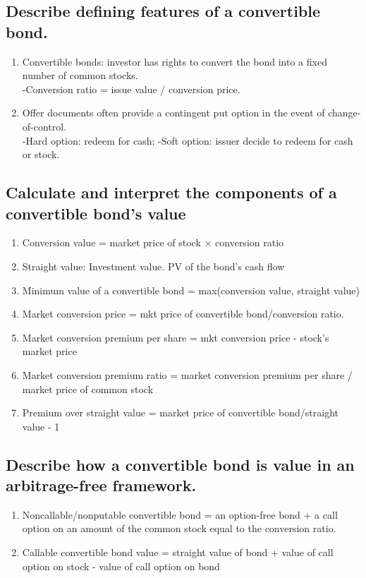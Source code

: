\documentclass{article}
\newcommand{\be}{\begin{enumerate}}
\newcommand{\ee}{\end{enumerate}}
\begin{document}
\subsection{Describe defining features of a convertible bond.}
\be
    \item Convertible bonds: investor has rights to convert the bond into a fixed number of common stocks.
        \\-Conversion ratio = issue value / conversion price.
    \item Offer documents often provide a contingent put option in the event of change-of-control.
        \\-Hard option: redeem for cash; -Soft option: issuer decide to redeem for cash or stock.
\ee
\subsection{Calculate and interpret the components of a convertible bond's value}
\be
    \item Conversion value = market price of stock $\times$ conversion ratio
    \item Straight value: Investment value. PV of the bond's cash flow
    \item Minimum value of a convertible bond = max(conversion value, straight value)
    \item Market conversion price = mkt price of convertible bond/conversion ratio.
    \item Market conversion premium per share = mkt conversion price - stock's market price
    \item Market conversion premium ratio = market conversion premium per share / market price of common stock
    \item Premium over straight value = market price of convertible bond/straight value - 1
\ee
\subsection{Describe how a convertible bond is value in an arbitrage-free framework.}
\be
    \item Noncallable/nonputable convertible bond = an option-free bond + a call option on an
    amount of the common stock equal to the conversion ratio.
    \item Callable convertible bond value = straight value of bond + value of call option on stock - value
    of call option on bond
\ee
\end{document}
